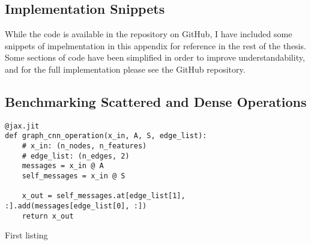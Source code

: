 \documentclass[../main.tex]{subfiles}
\begin{document}
\begin{appendices}
    \chapter{Implementation Snippets}\label{ch:implementation-snippets}
    While the code is available in the repository on GitHub, I have included some snippets of impelmentation in this appendix for reference in the rest of the thesis.
    Some sections of code have been simplified in order to improve understandability, and for the full implementation please see the GitHub repository.

    \section{Benchmarking Scattered and Dense Operations}\label{sec:benchmarking-scattered-and-dense-operations}
    \begin{listing}[!ht]
        \begin{verbatim}
@jax.jit
def graph_cnn_operation(x_in, A, S, edge_list):
    # x_in: (n_nodes, n_features)
    # edge_list: (n_edges, 2)
    messages = x_in @ A
    self_messages = x_in @ S

    x_out = self_messages.at[edge_list[1], :].add(messages[edge_list[0], :])
    return x_out
        \end{verbatim}
        \caption{First listing}
        \label{lst:scatter}
    \end{listing}
\end{appendices}
\end{document}

